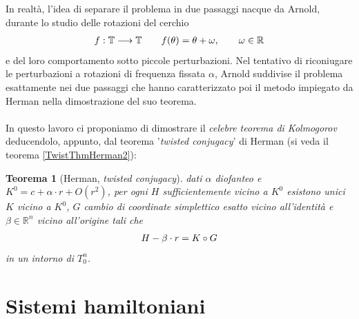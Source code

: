 \documentclass[twoside, 11pt]{amsbook}
\newcommand{\0}{{(0)}}
\newcommand{\3}{{(3)}}
\theoremstyle{colonplain}
\newtheorem{thm}{Teorema}[chapter]
\theoremstyle{colondefinition}
\theoremstyle{colonremark}
\numberwithin{equation}{chapter}
\begin{document}
In realtà, l'idea di separare il problema in due passaggi nacque da Arnold, durante lo studio delle rotazioni del cerchio
\begin{align}
    f : \mathbb{T} \longrightarrow \mathbb{T} \qquad f(\theta) = \theta + \omega, \qquad \omega \in \mathbb{R} \notag
\end{align}
e del loro comportamento sotto piccole perturbazioni. Nel tentativo di riconiugare le perturbazioni a rotazioni di frequenza fissata $\alpha$, Arnold suddivise il problema esattamente nei due passaggi che hanno caratterizzato poi il metodo impiegato da Herman nella dimostrazione del suo teorema. \\ \\
In questo lavoro ci proponiamo di dimostrare il \textit{celebre teorema di Kolmogorov} deducendolo, appunto, dal teorema '\textit{twisted conjugacy}' di Herman (si veda il teorema \ref{TwistThmHerman2}):
\begin{thm}[Herman, \textit{twisted conjugacy}]
    dati $\alpha$ diofanteo e $K^0 = c + \alpha \cdot r + O(r^2)$, per ogni $H$ sufficientemente vicino a $K^0$ esistono unici $K$ vicino a $K^0$, $G$ cambio di coordinate simplettico esatto vicino all'identità e $\beta \in \mathbb{R}^n$ vicino all'origine tali che
\begin{align}
    H - \beta \cdot r = K \circ G \notag
\end{align}
in un intorno di $T^n_0$.
\end{thm}



\chapter{Sistemi hamiltoniani}
\end{document}
